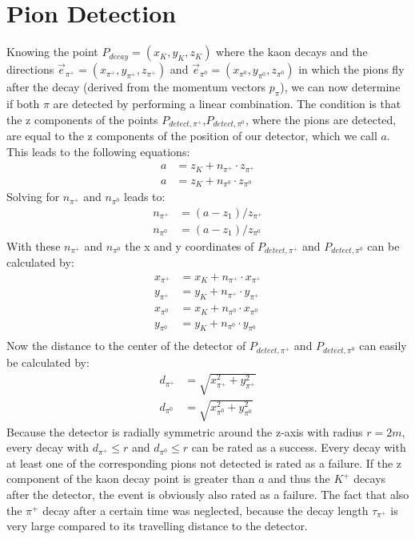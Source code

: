 \documentclass[a4paper,parskip,11pt, DIV12]{scrreprt}
\begin{document}
	\clearpage
	
	
	\section{Pion Detection} \label{sec:pdetection}
	
	Knowing the point $P_{decay}=(x_K,y_K,z_K)$  where the kaon decays and the directions $\vec{e}_{\pi^+}=(x_{\pi^+},y_{\pi^+},z_{\pi^+})$ and $\vec{e}_{\pi^0}=(x_{\pi^0},y_{\pi^0},z_{\pi^0})$ in which the pions fly after the decay (derived from the momentum vectors $p_{\pi}$), we can now determine if both $\pi$ are detected by performing a linear combination. The condition is that the z components of the points $P_{detect,\pi^+}$,$P_{detect,\pi^0}$, where the pions are detected, are equal to the z components of the position of our detector, which we call $a$. This leads to the following equations:
	\begin{align*}
		a &= z_K + n_{\pi^+} \cdot z_{\pi^+} \\ 
		a &= z_K + n_{\pi^0} \cdot z_{\pi^0}
	\end{align*} 
	Solving for $n_{\pi^+}$ and  $n_{\pi^0}$ leads to: 
	\begin{align*}
		n_{\pi^+} &= (a-z_1)/z_{\pi^+}\\
		n_{\pi^0} &= (a-z_1)/z_{\pi^0}
	\end{align*}
	With these $n_{\pi^+}$ and $n_{\pi^0}$ the x and y coordinates of $P_{detect,\pi^+}$ and $P_{detect,\pi^0}$ can be calculated by:
	\begin{align*}
		x_{\pi^+} &= x_K+n_{\pi^+} \cdot x_{\pi^+}\\
		y_{\pi^+} &= y_K+n_{\pi^+} \cdot y_{\pi^+}\\
		x_{\pi^0} &= x_K+n_{\pi^0} \cdot x_{\pi^0}\\
		y_{\pi^0} &= y_K+n_{\pi^0} \cdot y_{\pi^0}\\
	\end{align*}
	Now the distance to the center of the detector of $P_{detect,\pi^+}$ and $P_{detect,\pi^0}$ can easily be calculated by:
	\begin{align*}
		d_{\pi^+} &= \sqrt{x_{\pi^+}^2 + y_{\pi^+}^2}\\
		d_{\pi^0} &= \sqrt{x_{\pi^0}^2 +  y_{\pi^0}^2} 
	\end{align*}
	Because the detector is radially symmetric around the z-axis with radius $r=2m$, every decay with $d_{\pi^+} \leq r$ and $d_{\pi^0} \leq r$ can be rated as a success. Every decay with at least one of the corresponding pions not detected is rated as a failure. 
	If the z component of the kaon decay point is greater than $a$ and thus the $K^+$ decays after the detector, the event is obviously also rated as a failure. The fact that also the $\pi^+$ decay after a certain time was neglected, because the decay length $\tau_{\pi^+}$ is very large compared to its travelling distance to the detector.
	
\end{document}
